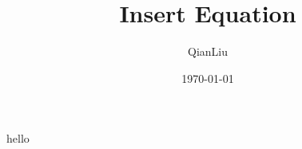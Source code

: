 \documentclass{article}
\author{QianLiu}
\title{Insert Equation}
\date{\today}
\begin{document}
    hello
\end{document}
